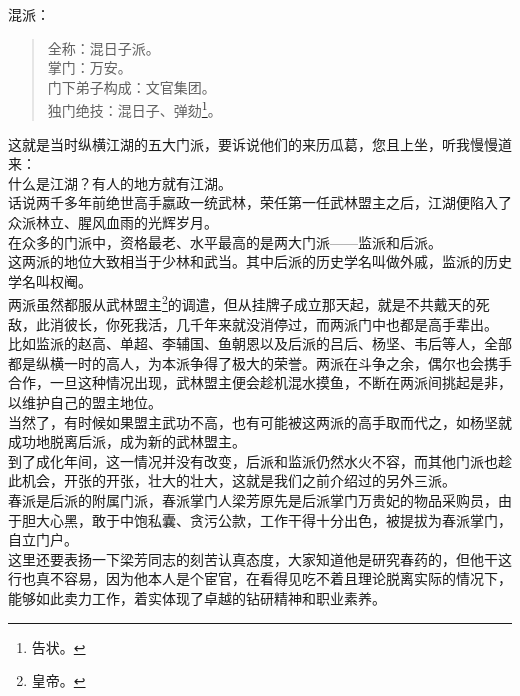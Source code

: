 \begin{multicols}{\theparacolNo}
混派：
{\footnotesize \begin{quote}
	全称：混日子派。\\
	掌门：万安。\\
	门下弟子构成：文官集团。\\
	独门绝技：混日子、弹劾\footnote{告状。}。\\
\end{quote}}

这就是当时纵横江湖的五大门派，要诉说他们的来历瓜葛，您且上坐，听我慢慢道来：\\

什么是江湖？有人的地方就有江湖。\\

话说两千多年前绝世高手嬴政一统武林，荣任第一任武林盟主之后，江湖便陷入了众派林立、腥风血雨的光辉岁月。\\

在众多的门派中，资格最老、水平最高的是两大门派——监派和后派。\\

这两派的地位大致相当于少林和武当。其中后派的历史学名叫做外戚，监派的历史学名叫权阉。\\

两派虽然都服从武林盟主\footnote{皇帝。}的调遣，但从挂牌子成立那天起，就是不共戴天的死敌，此消彼长，你死我活，几千年来就没消停过，而两派门中也都是高手辈出。\\

比如监派的赵高、单超、李辅国、鱼朝恩以及后派的吕后、杨坚、韦后等人，全部都是纵横一时的高人，为本派争得了极大的荣誉。两派在斗争之余，偶尔也会携手合作，一旦这种情况出现，武林盟主便会趁机混水摸鱼，不断在两派间挑起是非，以维护自己的盟主地位。\\

当然了，有时候如果盟主武功不高，也有可能被这两派的高手取而代之，如杨坚就成功地脱离后派，成为新的武林盟主。\\

到了成化年间，这一情况并没有改变，后派和监派仍然水火不容，而其他门派也趁此机会，开张的开张，壮大的壮大，这就是我们之前介绍过的另外三派。\\

春派是后派的附属门派，春派掌门人梁芳原先是后派掌门万贵妃的物品采购员，由于胆大心黑，敢于中饱私囊、贪污公款，工作干得十分出色，被提拔为春派掌门，自立门户。\\

这里还要表扬一下梁芳同志的刻苦认真态度，大家知道他是研究春药的，但他干这行也真不容易，因为他本人是个宦官，在看得见吃不着且理论脱离实际的情况下，能够如此卖力工作，着实体现了卓越的钻研精神和职业素养。\\


\end{multicols}
